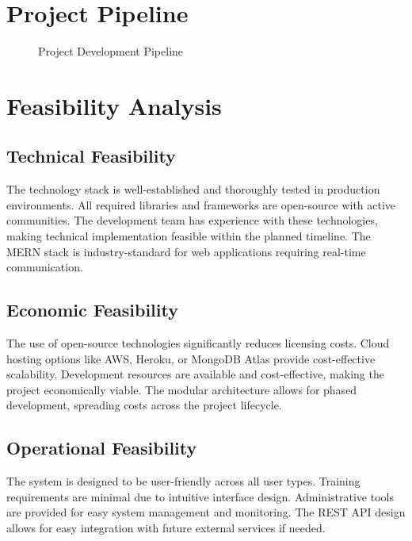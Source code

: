 \section{Project Pipeline}
\begin{figure}[H]
    \centering
    \caption{Project Development Pipeline}
    \label{fig:pipeline}
\end{figure}

\section{Feasibility Analysis}

\subsection{Technical Feasibility}
The technology stack is well-established and thoroughly tested in production environments. All required libraries and frameworks are open-source with active communities. The development team has experience with these technologies, making technical implementation feasible within the planned timeline. The MERN stack is industry-standard for web applications requiring real-time communication.

\subsection{Economic Feasibility}
The use of open-source technologies significantly reduces licensing costs. Cloud hosting options like AWS, Heroku, or MongoDB Atlas provide cost-effective scalability. Development resources are available and cost-effective, making the project economically viable. The modular architecture allows for phased development, spreading costs across the project lifecycle.

\subsection{Operational Feasibility}
The system is designed to be user-friendly across all user types. Training requirements are minimal due to intuitive interface design. Administrative tools are provided for easy system management and monitoring. The REST API design allows for easy integration with future external services if needed.

